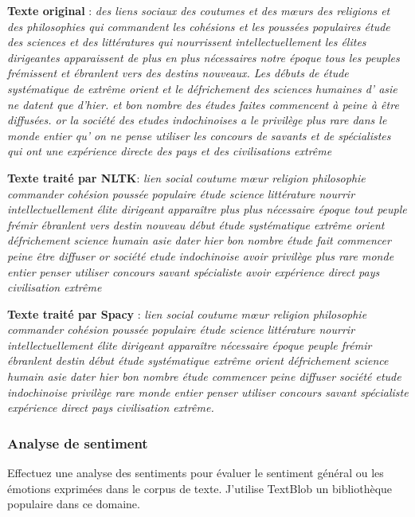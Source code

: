 \textbf{Texte original} : \textit{des liens sociaux des coutumes et des mœurs des religions et des philosophies qui commandent les cohésions et les poussées populaires étude des sciences et des littératures qui nourrissent intellectuellement les élites dirigeantes apparaissent de plus en plus nécessaires notre époque tous les peuples frémissent et ébranlent vers des destins nouveaux. Les débuts de étude systématique de extrême orient et le défrichement des sciences humaines d' asie ne datent que d'hier. et bon nombre des études faites commencent à peine à être diffusées. or la société des etudes indochinoises a le privilège plus rare dans le monde entier qu' on ne pense utiliser les concours de savants et de spécialistes qui ont une expérience directe des pays et des civilisations extrême}

\textbf{Texte traité par NLTK}: \textit{ lien social coutume mœur religion philosophie commander cohésion poussée populaire    étude science littérature nourrir intellectuellement élite dirigeant apparaître plus plus nécessaire    époque    tout peuple frémir    ébranlent vers destin nouveau début    étude systématique    extrême orient défrichement science humain    asie dater    hier bon nombre étude fait commencer    peine    être diffuser or société etude indochinoise avoir privilège plus rare monde entier penser    utiliser concours savant spécialiste avoir expérience direct pays civilisation extrême}

\textbf{Texte traité par Spacy} : \textit{ lien social coutume mœur religion philosophie commander cohésion poussée populaire    étude science littérature nourrir intellectuellement élite dirigeant apparaître nécessaire    époque    peuple frémir    ébranlent destin début    étude systématique    extrême orient défrichement science humain    asie dater    hier bon nombre étude commencer    peine    diffuser société etude indochinoise privilège rare monde entier penser    utiliser concours savant spécialiste expérience direct pays civilisation extrême.}
\subsubsection{Analyse de sentiment}

Effectuez une analyse des sentiments pour évaluer le sentiment général ou les émotions exprimées dans le corpus de texte. J’utilise TextBlob un bibliothèque populaire dans ce domaine.

